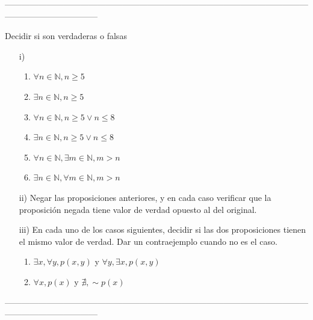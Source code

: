 \documentclass[10pt]{article}
\begin{document}
\begin{ej}
\begin{itemize}
\begin{figure}[H]
\begin{minipage}[b]{0.4\linewidth}
			\end{minipage}
		\end{figure}					
			
	\end{itemize}
\end{ej}
 ---------------------------------------------------------------------------------------------------------------------------------------------
\begin{ej}
Decidir si son verdaderas o falsas
\begin{itemize}
	\item[i)]
		\begin{enumerate}
			\item $\forall n \in \mathbb{N}, n \geq 5$
			\item $\exists n \in \mathbb{N}, n \geq 5$
			\item $\forall n \in \mathbb{N}, n \geq 5 \lor n \leq 8$
			\item $\exists n \in \mathbb{N}, n \geq 5 \lor n \leq 8$
			\item $\forall n \in \mathbb{N}, \exists m \in \mathbb{N}, m>n $
			\item $\exists n \in \mathbb{N}, \forall m \in \mathbb{N}, m>n $		
		\end{enumerate}
	\item[ii)] Negar las proposiciones anteriores, y en cada caso verificar que la proposición negada tiene valor de verdad opuesto al del original.
	\item[iii)] En cada uno de los casos siguientes, decidir si las dos proposiciones tienen el mismo valor de verdad. Dar un contraejemplo cuando no es el caso. 
	\begin{enumerate}
		\item $\exists x, \forall y , p(x,y) $ y $ \forall y , \exists x, p(x,y)$	
		\item  $\forall  x, p(x) $ y  $ \nexists, \sim p(x)$ 
				
	\end{enumerate}
\end{itemize}
\end{ej}
---------------------------------------------------------------------------------------------------------------------------------------------
\end{document}
